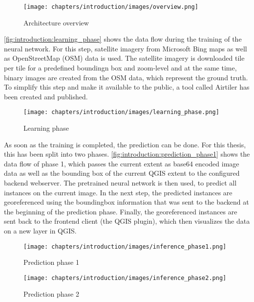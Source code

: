 \begin{figure}[H]
    \centering
	\texttt{[image: chapters/introduction/images/overview.png]}
	\caption{Architecture overview}
	\label{fig:introduction:architecture_overview}
\end{figure}

\autoref{fig:introduction:learning_phase} shows the data flow during the training of the neural network. For this step, satellite imagery from Microsoft Bing maps as well as OpenStreetMap (OSM) data is used. The satellite imagery is downloaded tile per tile for a predefined boundingn box and zoom-level and at the same time, binary images are created from the OSM data, which represent the ground truth. To simplify this step and make it available to the public, a tool called Airtiler \cite{airtiler} has been created and published.

\begin{figure}[H]
    \centering
	\texttt{[image: chapters/introduction/images/learning\_phase.png]}
	\caption{Learning phase}
	\label{fig:introduction:learning_phase}
\end{figure}

As soon as the training is completed, the prediction can be done. For this thesis, this has been split into two phases. \autoref{fig:introduction:prediction_phase1} shows the data flow of phase 1, which passes the current extent as base64 encoded image data as well as the bounding box of the current QGIS extent to the configured backend webserver. The pretrained neural network is then used, to predict all instances on the current image. In the next step, the predicted instances are georeferenced using the boundingbox information that was sent to the backend at the beginning of the prediction phase. Finally, the georeferenced instances are sent back to the frontend client (the QGIS plugin), which then visualizes the data on a new layer in QGIS.

\begin{figure}[H]
    \centering
	\texttt{[image: chapters/introduction/images/inference\_phase1.png]}
	\caption{Prediction phase 1}
	\label{fig:introduction:prediction_phase1}
\end{figure}

\begin{figure}[H]
    \centering
	\texttt{[image: chapters/introduction/images/inference\_phase2.png]}
	\caption{Prediction phase 2}
	\label{fig:introduction:prediction_phase2}
\end{figure}



